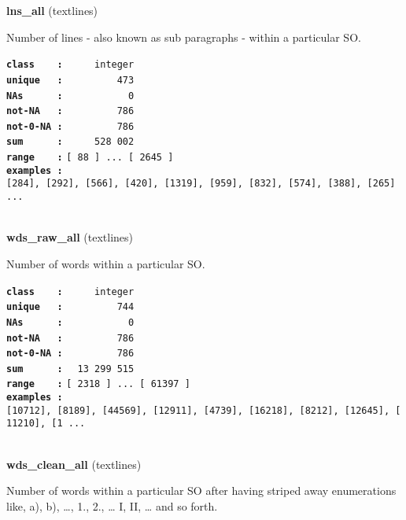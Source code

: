 \documentclass[]{article}
\begin{document}
\textbf{lns\_all} (textlines)

Number of lines - also known as sub paragraphs - within a particular SO.

\textbf{\texttt{class\ \ \ \ :}} \texttt{~~~~~integer}\\
\textbf{\texttt{unique\ \ \ :}} \texttt{~~~~~~~~~473}\\
\textbf{\texttt{NAs\ \ \ \ \ \ :}} \texttt{~~~~~~~~~~~0}\\
\textbf{\texttt{not-NA\ \ \ :}} \texttt{~~~~~~~~~786}\\
\textbf{\texttt{not-0-NA\ :}} \texttt{~~~~~~~~~786}\\
\textbf{\texttt{sum\ \ \ \ \ \ :}} \texttt{~~~~~528~002}\\
\textbf{\texttt{range\ \ \ \ :}}
\texttt{{[}\ 88\ {]}\ ...\ {[}\ 2645\ {]}}\\
\textbf{\texttt{examples\ :}}
\texttt{{[}284{]},\ {[}292{]},\ {[}566{]},\ {[}420{]},\ {[}1319{]},\ {[}959{]},\ {[}832{]},\ {[}574{]},\ {[}388{]},\ {[}265{]}\ ...}\\

~

\textbf{wds\_raw\_all} (textlines)

Number of words within a particular SO.

\textbf{\texttt{class\ \ \ \ :}} \texttt{~~~~~integer}\\
\textbf{\texttt{unique\ \ \ :}} \texttt{~~~~~~~~~744}\\
\textbf{\texttt{NAs\ \ \ \ \ \ :}} \texttt{~~~~~~~~~~~0}\\
\textbf{\texttt{not-NA\ \ \ :}} \texttt{~~~~~~~~~786}\\
\textbf{\texttt{not-0-NA\ :}} \texttt{~~~~~~~~~786}\\
\textbf{\texttt{sum\ \ \ \ \ \ :}} \texttt{~~13~299~515}\\
\textbf{\texttt{range\ \ \ \ :}}
\texttt{{[}\ 2318\ {]}\ ...\ {[}\ 61397\ {]}}\\
\textbf{\texttt{examples\ :}}
\texttt{{[}10712{]},\ {[}8189{]},\ {[}44569{]},\ {[}12911{]},\ {[}4739{]},\ {[}16218{]},\ {[}8212{]},\ {[}12645{]},\ {[}11210{]},\ {[}1\ ...}\\

~

\textbf{wds\_clean\_all} (textlines)

Number of words within a particular SO after having striped away
enumerations like, a), b), \ldots{}, 1., 2., \ldots{} I, II, \ldots{}
and so forth.
\end{document}
